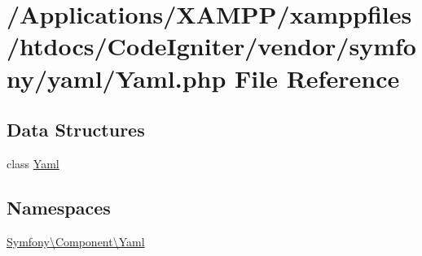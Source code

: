 \hypertarget{_yaml_8php}{}\section{/\+Applications/\+X\+A\+M\+P\+P/xamppfiles/htdocs/\+Code\+Igniter/vendor/symfony/yaml/\+Yaml.php File Reference}
\label{_yaml_8php}
\subsection*{Data Structures}
\begin{DoxyCompactItemize}
\item 
class \mbox{\hyperlink{class_symfony_1_1_component_1_1_yaml_1_1_yaml}{Yaml}}
\end{DoxyCompactItemize}
\subsection*{Namespaces}
\begin{DoxyCompactItemize}
\item 
 \mbox{\hyperlink{namespace_symfony_1_1_component_1_1_yaml}{Symfony\textbackslash{}\+Component\textbackslash{}\+Yaml}}
\end{DoxyCompactItemize}
